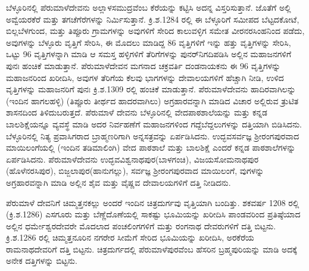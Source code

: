 ಬೆಳ್ಳೂರಿನಲ್ಲಿ ಪೆರುಮಾಳೆದೇವನು ಅಲ್ಲಾಳಸಮುದ್ರವೆಂಬ ಕೆರೆಯನ್ನು ಕಟ್ಟಿಸಿ ಅದನ್ನ ವಿಸ್ತರಿಸುತ್ತಾನೆ. ಜೊತೆಗೆ ಅಲ್ಲಿ ಅವ್ವೆಯರಕೆರೆ ಮತ್ತು ತಗಚೆಗೆರೆಗಳನ್ನು ನಿರ್ಮಿಸುತ್ತಾನೆ. ಕ್ರಿ.ಶ.1284 ರಲ್ಲಿ ಈ ಬೆಳ್ಳೂರಿಗೆ ಸಮೀಪದ ಬೆಟ್ಟದಕೋಟೆ, ಬಿಲ್ಲಬೆಳಗುಂದ, ಮತ್ತು ತಿಪ್ಪೂರು ಗ್ರಾಮಗಳನ್ನು ಅವುಗಳಿಗೆ ಸೇರಿದ ಕಾಲುವಳ್ಳಿಗ ಸಮೇತ ವೀರನರಸಿಂಹನಿಂದ ಪಡೆದು, ಅವುಗಳನ್ನು ಬೆಳ್ಳೂರು ವೃತ್ತಿಗೆ ಸೇರಿಸಿ, ಈ ಮೊದಲು ಮಾಡಿದ್ದ 86 ವೃತ್ತಿಗಳಿಗೆ ಇನ್ನು ಹತ್ತು ವೃತ್ತಿಗಳನ್ನು ಸೇರಿಸಿ, ಒಟ್ಟು 96 ವೃತ್ತಿಗಳನ್ನಾಗಿ ಮಾಡಿ ಆ ಸಮಸ್ತ ಹಳ್ಳಿಗಳಿಗೆ ತೆರಿಗೆಗಳನ್ನು ಪುನರ್​ನಿಗದಿಪಡಿಸಿ ಅಲ್ಲಿನ ಮಹಾಜನಗಳಿಗೆ ಪುನಃ ಹಂಚಿಕೆ ಮಾಡುತ್ತಾನೆ. ಪೆರುಮಾಳೆದೇವನ ಮಗನಾದ ಚಕ್ರವರ್ತಿ ದಂಡನಾಯಕನು ಈ 96 ವೃತ್ತಿಗಳನ್ನು ಮಹಾಜನರಿಂದ ಖರೀದಿಸಿ, ಅವುಗಳ ತೆರಿಗೆಯ ಕೆಲವು ಭಾಗಗಳನ್ನು ದೇವಾಲಯಗಳಿಗೆ ಹೆಚ್ಚಾಗಿ ನೀಡಿ, ಉಳಿದ ವೃತ್ತಿಗಳನ್ನು ಮಹಾಜನರಿಗೆ ಪುನಃ ಕ್ರಿ.ಶ.1309 ರಲ್ಲಿ ಹಂಚಿಕೆ ಮಾಡುತ್ತಾನೆ. ಪೆರುಮಾಳೆದೇವನು ಹಾದಿರವಾಗಿಲನ್ನು (ಇಂದಿನ ಹಾಗಲಹಳ್ಳಿ) (ತಿಪ್ಪೂರು ತೀರ್ಥದ ಹಾದರವಾಗಿಲು) ಅಗ್ರಹಾರವನ್ನಾಗಿ ಮಾಡಿದ ವಿಚಾರ ಅಲ್ಲಿರುವ ತ್ರುಟಿತ ಶಾಸನದಿಂದ ತಿಳಿದುಬರುತ್ತದೆ. ಪೆರುಮಾಳೆ ದೇವನು ಬೆಳ್ಳೂರಿನಲ್ಲಿ ವೇದಪಾಠಶಾಲೆಯನ್ನು ಮತ್ತು ಕನ್ನಡ ಬಾಲಶಿಕ್ಷೆಯನ್ನೂ ವ್ಯವಸ್ಥೆ ಮಾಡಿ ಅದರ ನಿರ್ವಹಣೆಗೆ ಮಹಾಜನಗಳಿಂದ ಗದ್ದೆಬೆದ್ದಲುಗಳನ್ನು ದತ್ತಿಯಾಗಿ ಬಿಡಿಸಿದನು. ಬೆಳ್ಳೂರಿನಲ್ಲಿ ನಿತ್ಯ ಪ್ರವಾಸಿಗರಾದ ಬ್ರಾಹ್ಮಣರಿಗಾಗಿ ಅನ್ನಸತ್ರವನ್ನು ಏರ್ಪಡಿಸಿದನು. ಉದ್ಭವಸರ್ವಜ್ಞ ಶ‍್ರೀರಂಗಪುರವಾದ ಮಾಯಿಲಂಗೆಯಲ್ಲಿ (ಇಂದಿನ ತಡಿಮಾಲಿಂಗಿ) ವೇದ ಪಾಠಶಾಲೆ ಮತ್ತು ಬಾಲಶಿಕ್ಷೆ ಎಂದರೆ ಕನ್ನಡ ಪಾಠಶಾಲೆಗಳನ್ನು ಏರ್ಪಡಿಸಿದನು. ಪೆರುಮಾಳೆದೇವನು ಉದ್ಭವವಿಶ್ವನಾಥಪುರ(ಬಾಳಗಂಚಿ), ವಿಜಯಸೋಮನಾಥಪುರ (ಹೊಳೆನರಸಿಪುರ), ಬಿಜ್ಜಲಾಪುರ(ಹಾನುಗಲ್ಲು), ಸರ್ವಜ್ಞ ಶ‍್ರೀರಂಗಪುರವಾದ ಮಾಯಿಲಂಗೆ, ವುಗಳನ್ನು ಅಗ್ರಹಾರವನ್ನಾಗಿ ಮಾಡಿ ಅಲ್ಲಿನ ಶೈವ ಮತ್ತು ವೈಷ್ಣವ ದೇವಾಲಯಗಳಿಗೆ ದತ್ತಿ ನೀಡಿದನು.

ಪೆರುಮಾಳೆ ದೇವನಿಗೆ ಚಿಮ್ಮತ್ತನಕಲ್ಲು ಅಂದರೆ ಇಂದಿನ ಚಿತ್ರದುರ್ಗವು ವೃತ್ತಿಯಾಗಿ ಬಂದಿತ್ತು. ಶಕವರ್ಷ 1208 ರಲ್ಲಿ (ಕ್ರಿ.ಶ.1286) ಎಸಗೂರು ಮತ್ತು ಬೆಣ್ಣೆದೊಣೆಯಲ್ಲಿ ಸಾಕಷ್ಟು ಭೂಮಿಯನ್ನು ಖರೀದಿಸಿ ಪಾಂಡವರಿಂದ ಪ್ರತಿಷ್ಠೆಯಾದ ಅಲ್ಲಿನ ಧರ್ಮೇಶ್ವರದೇವರೇ ಮೊದಲಾದ ಪಂಚಲಿಂಗಗಳಿಗೆ ಮತ್ತು ರಂಗನಾಥ ದೇವರುಗಳಿಗೆ ದತ್ತಿ ಬಿಟ್ಟನು. ಕ್ರಿ.ಶ.1286 ರಲ್ಲಿ ಚಿಮ್ಮತ್ತನೂರಿನ ನಗರೇರ ಸೀಮೆಗೆ ಸೇರಿದ ಭೂಮಿಯನ್ನು ಖರೀದಿಸಿ, ಅರಕೆರೆಯ ರಾಮನಾಥದೇವರಿಗೆ ದತ್ತಿ ಬಿಟ್ಟನು. ಚಿತ್ರದುರ್ಗದಲ್ಲಿ ಪೆರುಮಾಳೆಪುರವೆಂಬ ಹೆಸರಿನ ಬ್ರಹ್ಮಪುರಿಯನ್ನು ಮಾಡಿ ಅದಕ್ಕೆ ಅನೇಕ ದತ್ತಿಗಳನ್ನು ಬಿಟ್ಟನು.

